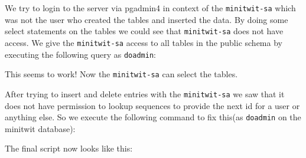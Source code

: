 We try to login to the server via pgadmin4 in context of the \texttt{minitwit-sa} which was not the user who created the tables and inserted the data. By doing some select statements on the tables we could see that \texttt{minitwit-sa} does not have access. We give the \texttt{minitwit-sa} access to all tables in the public schema by executing the following query as \texttt{doadmin}:

\begin{Shaded}
\begin{Highlighting}[]
 \NormalTok{, }\NormalTok{, }\NormalTok{, }        \NormalTok{;}
\end{Highlighting}
\end{Shaded}

This seems to work! Now the \texttt{minitwit-sa} can select the tables.

After trying to insert and delete entries with the \texttt{minitwit-sa} we saw that it does not have permission to lookup sequences to provide the next id for a user or anything else. So we execute the following command to fix this(as \texttt{doadmin} on the minitwit database):

\begin{Shaded}
\begin{Highlighting}[]
 \NormalTok{, }      \NormalTok{;}
\end{Highlighting}
\end{Shaded}

The final script now looks like this:

